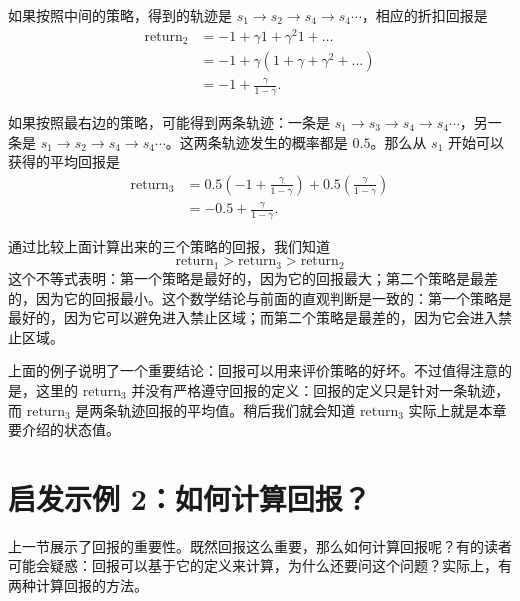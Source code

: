 如果按照中间的策略，得到的轨迹是 $s_1 \to s_2 \to s_4 \to s_4 \cdots$，相应的折扣回报是
\begin{equation*}
\begin{aligned}
\mathrm{return}_2 &= -1 + \gamma 1 + \gamma^2 1 + \dots \\
&= -1 + \gamma (1 + \gamma + \gamma^2 + \dots) \\
&= -1 + \frac{\gamma}{1 - \gamma}.
\end{aligned}
\end{equation*}

如果按照最右边的策略，可能得到两条轨迹：一条是 $s_1 \to s_3 \to s_4 \to s_4 \cdots$，另一条是 $s_1 \to s_2 \to s_4 \to s_4 \cdots$。这两条轨迹发生的概率都是 $0.5$。那么从 $s_1$ 开始可以获得的平均回报是
\begin{equation*}
\begin{aligned}
\mathrm{return}_3 &= 0.5 \left(-1 + \frac{\gamma}{1 - \gamma}\right) + 0.5 \left(\frac{\gamma}{1 - \gamma}\right) \\
&= -0.5 + \frac{\gamma}{1 - \gamma}.
\end{aligned}
\end{equation*}

通过比较上面计算出来的三个策略的回报，我们知道
\begin{equation}
\mathrm{return}_1 > \mathrm{return}_3 > \mathrm{return}_2
\label{eq:rl-bellman-return-order}
\end{equation}
这个不等式表明：第一个策略是最好的，因为它的回报最大；第二个策略是最差的，因为它的回报最小。这个数学结论与前面的直观判断是一致的：第一个策略是最好的，因为它可以避免进入禁止区域；而第二个策略是最差的，因为它会进入禁止区域。

上面的例子说明了一个重要结论：回报可以用来评价策略的好坏。不过值得注意的是，这里的 $\mathrm{return}_3$ 并没有严格遵守回报的定义：回报的定义只是针对一条轨迹，而 $\mathrm{return}_3$ 是两条轨迹回报的平均值。稍后我们就会知道 $\mathrm{return}_3$ 实际上就是本章要介绍的状态值。

\section{启发示例 2：如何计算回报？}
\label{sec:rl-bellman-compute-return}

上一节展示了回报的重要性。既然回报这么重要，那么如何计算回报呢？有的读者可能会疑惑：回报可以基于它的定义来计算，为什么还要问这个问题？实际上，有两种计算回报的方法。

